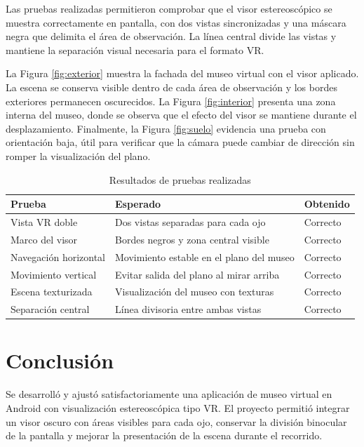 \documentclass[conference]{IEEEtran}
\begin{document}
Las pruebas realizadas permitieron comprobar que el visor estereoscópico se muestra correctamente en pantalla, con dos vistas sincronizadas y una máscara negra que delimita el área de observación. La línea central divide las vistas y mantiene la separación visual necesaria para el formato VR.

La Figura \ref{fig:exterior} muestra la fachada del museo virtual con el visor aplicado. La escena se conserva visible dentro de cada área de observación y los bordes exteriores permanecen oscurecidos. La Figura \ref{fig:interior} presenta una zona interna del museo, donde se observa que el efecto del visor se mantiene durante el desplazamiento. Finalmente, la Figura \ref{fig:suelo} evidencia una prueba con orientación baja, útil para verificar que la cámara puede cambiar de dirección sin romper la visualización del plano.

\begin{table}[H]
\centering
\caption{Resultados de pruebas realizadas}
\label{tab:pruebas}
\begin{tabular}{p{}|p{}|p{}}
\toprule
Prueba & Esperado & Obtenido\\
\midrule
Vista VR doble & Dos vistas separadas para cada ojo & Correcto\\
Marco del visor & Bordes negros y zona central visible & Correcto\\
Navegación horizontal & Movimiento estable en el plano del museo & Correcto\\
Movimiento vertical & Evitar salida del plano al mirar arriba & Correcto\\
Escena texturizada & Visualización del museo con texturas & Correcto\\
Separación central & Línea divisoria entre ambas vistas & Correcto\\
\bottomrule
\end{tabular}
\end{table}

\section{Conclusión}

Se desarrolló y ajustó satisfactoriamente una aplicación de museo virtual en Android con visualización estereoscópica tipo VR. El proyecto permitió integrar un visor oscuro con áreas visibles para cada ojo, conservar la división binocular de la pantalla y mejorar la presentación de la escena durante el recorrido.
\end{document}
